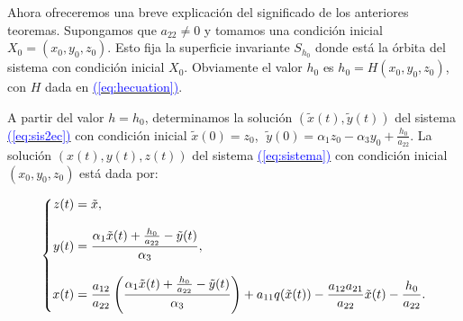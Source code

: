 \documentclass[12pt,a4paper]{report} %
\newcommand{\eref}[1]{\hyperref[#1]{\textcolor{blue}{(\ref*{#1})}}}
\begin{document}
	\vspace{0.5cm}Ahora ofreceremos una breve explicación del significado de los anteriores teoremas. Supongamos que $a_{22}\neq 0$ y tomamos una condición inicial $X_0=(x_0,y_0,z_0)$. Esto fija la superficie invariante $S_{h_0}$ donde está la órbita del sistema con condición inicial $X_0$. Obviamente el valor $h_0$ es $h_0=H(x_0,y_0,z_0)$, con $H$ dada en \eref{eq:hecuation}.
	
	\vspace{0.5cm}A partir del valor $h=h_0$, determinamos la solución $\left( \tilde{x}(t),\tilde{y}(t) \right)$ del sistema \eref{eq:sis2ec} con condición inicial $\tilde{x}(0)=z_0$, $\; \tilde{y}(0)=\alpha_1z_0-\alpha_3y_0+\frac{h_0}{a_{22}}$. La solución $(x(t),y(t),z(t))$ del sistema \eref{eq:sistema} con condición inicial $(x_0,y_0,z_0)$ está dada por:
	
	\begin{equation}
		\label{eq:solsis}
		\scalebox{1}{$\displaystyle
			\left\{
			\begin{aligned}
				z(t)&=\tilde{x}, \\[3mm]
				y(t)&= \frac{\alpha_1\tilde{x}(t)+\frac{h_0}{a_{22}}-\tilde{y}(t)}{\alpha_3},\\[3mm]
				x(t)&=\frac{a_{12}}{a_{22}}\left( \frac{\alpha_1\tilde{x}(t)+\frac{h_0}{a_{22}}-\tilde{y}(t)}{\alpha_3} \right) +a_{11}q(\tilde{x}(t))-\frac{a_{12}a_{21}}{a_{22}}\tilde{x}(t)-\frac{h_0}{a_{22}}.
			\end{aligned}
			\right.
			$}
	\end{equation}\smallskip
	

	
\end{document}
